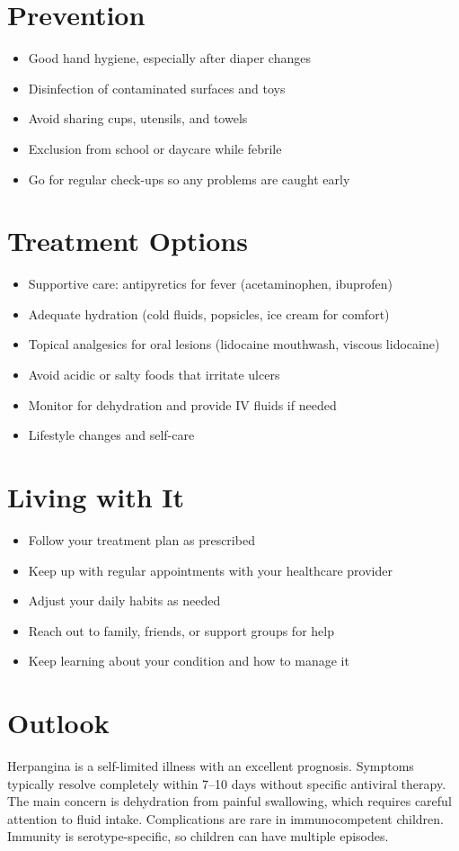 \section{Prevention}

\begin{itemize}[noitemsep]
  \item Good hand hygiene, especially after diaper changes
  \item Disinfection of contaminated surfaces and toys
  \item Avoid sharing cups, utensils, and towels
  \item Exclusion from school or daycare while febrile
  \item Go for regular check-ups so any problems are caught early
\end{itemize}

\section{Treatment Options}

\begin{itemize}[noitemsep]
  \item Supportive care: antipyretics for fever (acetaminophen, ibuprofen)
  \item Adequate hydration (cold fluids, popsicles, ice cream for comfort)
  \item Topical analgesics for oral lesions (lidocaine mouthwash, viscous lidocaine)
  \item Avoid acidic or salty foods that irritate ulcers
  \item Monitor for dehydration and provide IV fluids if needed
  \item Lifestyle changes and self-care
\end{itemize}

\section{Living with It}

\begin{itemize}[noitemsep]
  \item Follow your treatment plan as prescribed
  \item Keep up with regular appointments with your healthcare provider
  \item Adjust your daily habits as needed
  \item Reach out to family, friends, or support groups for help
  \item Keep learning about your condition and how to manage it
\end{itemize}

\section{Outlook}
Herpangina is a self-limited illness with an excellent prognosis. Symptoms typically resolve completely within 7--10 days without specific antiviral therapy. The main concern is dehydration from painful swallowing, which requires careful attention to fluid intake. Complications are rare in immunocompetent children. Immunity is serotype-specific, so children can have multiple episodes.

